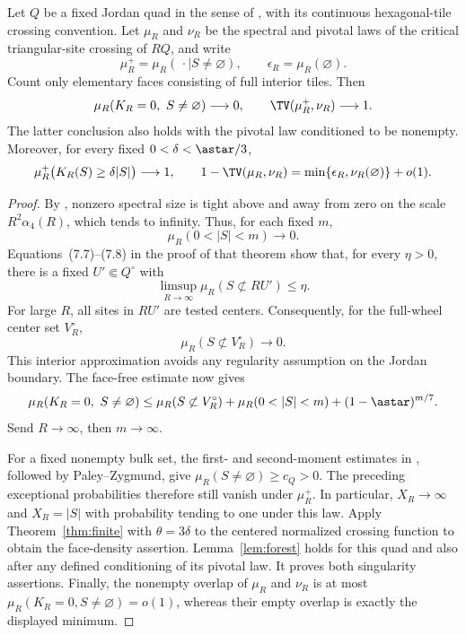 \begin{theorem}\label{thm:quads}
Let $Q$ be a fixed Jordan quad in the sense of \cite[Section~2.1]{GPS}, with its continuous hexagonal-tile crossing convention. Let $\mu_R$ and $\nu_R$ be the spectral and pivotal laws of the critical triangular-site crossing of $RQ$, and write
\[
 \mu_R^+=\mu_R(\,\cdot\mid S\ne\varnothing),\qquad
 \epsilon_R=\mu_R(\varnothing).
\]
Count only elementary faces consisting of full interior tiles. Then
\[
 \mu_R(K_R=0,\ S\ne\varnothing)\longrightarrow0,
 \qquad \TV(\mu_R^+,\nu_R)\longrightarrow1.
\]
The latter conclusion also holds with the pivotal law conditioned to be nonempty. Moreover, for every fixed $0<\delta<\astar/3$,
\[
 \mu_R^+\bigl(K_R(S)\ge\delta|S|\bigr)\longrightarrow1,
 \qquad
 1-\TV(\mu_R,\nu_R)
 =\min\{\epsilon_R,\nu_R(\varnothing)\}+o(1).
\]
\end{theorem}
\begin{proof}
By \cite[Theorem~7.4]{GPS}, nonzero spectral size is tight above and away from zero on the scale $R^2\alpha_4(R)$, which tends to infinity. Thus, for each fixed $m$,
\[
 \mu_R(0<|S|<m)\longrightarrow0.
\]
Equations~(7.7)--(7.8) in the proof of that theorem show that, for every $\eta>0$, there is a fixed $U'\Subset Q^\circ$ with
\[
 \limsup_{R\to\infty}\mu_R(S\not\subset RU')\le\eta.
\]
For large $R$, all sites in $RU'$ are tested centers. Consequently, for the full-wheel center set $V_R^\circ$,
\[
 \mu_R(S\not\subset V_R^\circ)\longrightarrow0.
\]
This interior approximation avoids any regularity assumption on the Jordan boundary. The face-free estimate now gives
\[
 \mu_R(K_R=0,\ S\ne\varnothing)
 \le\mu_R(S\not\subset V_R^\circ)
   +\mu_R(0<|S|<m)+(1-\astar)^{m/7}.
\]
Send $R\to\infty$, then $m\to\infty$.

For a fixed nonempty bulk set, the first- and second-moment estimates in \cite[Lemma~3.1]{GPS}, followed by Paley--Zygmund, give $\mu_R(S\ne\varnothing)\ge c_Q>0$. The preceding exceptional probabilities therefore still vanish under $\mu_R^+$. In particular, $X_R\to\infty$ and $X_R=|S|$ with probability tending to one under this law. Apply Theorem~\ref{thm:finite} with $\theta=3\delta$ to the centered normalized crossing function to obtain the face-density assertion. Lemma~\ref{lem:forest} holds for this quad and also after any defined conditioning of its pivotal law. It proves both singularity assertions. Finally, the nonempty overlap of $\mu_R$ and $\nu_R$ is at most $\mu_R(K_R=0,S\ne\varnothing)=o(1)$, whereas their empty overlap is exactly the displayed minimum.
\end{proof}

